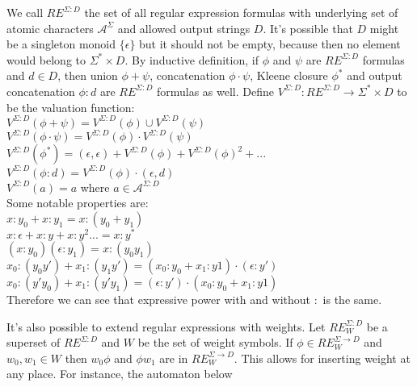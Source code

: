 We call  $RE^{\Sigma:D}$ the set of all regular expression formulas with underlying set of atomic characters $\mathcal{A}^\Sigma$ and allowed output strings $D$. It's possible that $D$ might be a singleton monoid $\{\epsilon \}$ but it should not be empty, because then no element would belong to $\Sigma^* \times D$. By inductive definition, if $\phi$ and $\psi$  are $RE^{ \Sigma:D}$  formulas and $d \in D$, then union $\phi + \psi$, concatenation $\phi \cdot \psi$, Kleene closure $\phi^*$ and output concatenation $\phi : d$ are $RE^{ \Sigma:D}$ formulas as well.  Define $V^{\Sigma:D}:RE^{\Sigma:D} \rightarrow \Sigma^* \times D$ to be the valuation function:  \\
$V^{\Sigma:D}(\phi + \psi) = V^{\Sigma:D}(\phi) \cup V^{\Sigma:D}(\psi)$ \\
$V^{\Sigma:D}(\phi \cdot \psi) = V^{\Sigma:D}(\phi) \cdot  V^{\Sigma:D}(\psi)$ \\
$V^{\Sigma:D}(\phi^*) = (\epsilon,\epsilon) + V^{\Sigma:D}(\phi) + V^{\Sigma:D}(\phi)^2 + ...$ \\
$V^{\Sigma:D}(\phi : d) = V^{\Sigma:D}(\phi)  \cdot (\epsilon,d)$ \\
$V^{\Sigma:D}(a) = a$ where $a\in\mathcal{A}^{\Sigma:D}$ \\
Some notable properties are: \\
$x:y_0 +x:y_1 = x:(y_0+y_1)$ \\
$x:\epsilon+x:y+x:y^2...=x:y^*$ \\
$(x:y_0)(\epsilon:y_1)  = x:(y_0y_1)$\\
$x_0:(y_0y')+x_1:(y_1y') = (x_0:y_0+x_1:y1)\cdot(\epsilon:y')$ \\
$x_0:(y'y_0)+x_1:(y'y_1) = (\epsilon:y')\cdot(x_0:y_0+x_1:y1)$  \\
Therefore we can see that expressive power with and without $:$ is the same. 

It's also possible to extend regular expressions with weights. Let $RE_W^{\Sigma: D}$ be a superset of $RE^{\Sigma: D}$ and $W$ be the set of weight symbols. If $\phi\in RE_W^{\Sigma\rightarrow D}$ and $w_0,w_1\in W$ then $w_0 \phi $ and  $\phi w_1 $ are in $RE_W^{\Sigma\rightarrow D}$. This allows for inserting weight at any place. For instance, the automaton below

